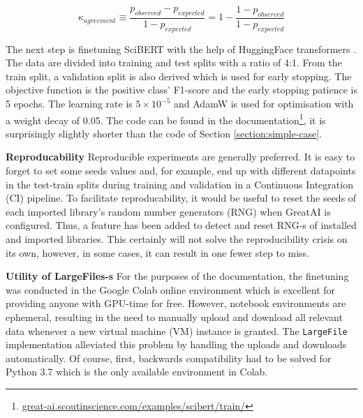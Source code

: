 \begin{equation} \label{equation:kappa}
\kappa_{agreement} \equiv \frac{p_{observed} - p_{expected}}{1 - p_{expected}} = 1 - \frac{1 - p_{observed}}{1 - p_{expected}} 
\end{equation}

The next step is finetuning SciBERT with the help of HuggingFace transformers \cite{wolf2019huggingface}. The data are divided into training and test splits with a ratio of 4:1. From the train split, a validation split is also derived which is used for early stopping. The objective function is the positive class' F1-score and the early stopping patience is 5 epochs. The learning rate is $5 \times 10^{-5}$ and AdamW \cite{loshchilov2017decoupled} is used for optimisation with a weight decay of 0.05. The code can be found in the documentation\footnote{\href{https://great-ai.scoutinscience.com/examples/scibert/train/}{great-ai.scoutinscience.com/examples/scibert/train/}}, it is surprisingly slightly shorter than the code of Section \ref{section:simple-case}.

\begin{displayquote}
\textbf{Reproducability} Reproducible experiments are generally preferred. It is easy to forget to set some seeds values and, for example, end up with different datapoints in the test-train splits during training and validation in a Continuous Integration (CI) pipeline. To facilitate reproducability, it would be useful to reset the seeds of each imported library's random number generators (RNG) when GreatAI is configured. Thus, a feature has been added to detect and reset RNG-s of installed and imported libraries. This certainly will not solve the reproducibility crisis \cite{hutson2018artificial} on its own, however, in some cases, it can result in one fewer step to miss.
\end{displayquote}

\begin{displayquote}
\textbf{Utility of LargeFiles-s} For the purposes of the documentation, the finetuning was conducted in the Google Colab online environment which is excellent for providing anyone with GPU-time for free. However, notebook environments are ephemeral, resulting in the need to manually upload and download all relevant data whenever a new virtual machine (VM) instance is granted. The \texttt{LargeFile} implementation alleviated this problem by handling the uploads and downloads automatically. Of course, first, backwards compatibility had to be solved for Python 3.7 which is the only available environment in Colab.
\end{displayquote}

